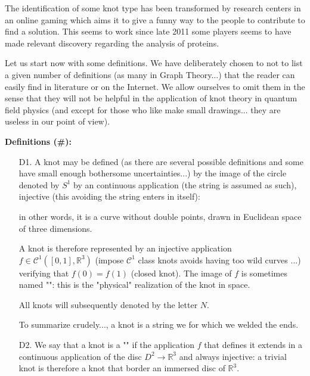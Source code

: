 {	\begin{tcolorbox}[title=Remark,colframe=black,arc=10pt]
	The identification of some knot type has been transformed by research centers in an online gaming which aims it to give a funny way to the people to contribute to find a solution. This seems to work since late 2011 some players seems to have made  relevant discovery regarding the analysis of proteins.
	\end{tcolorbox}
	
	Let us start now with some definitions. We have deliberately chosen to not to list a given number of definitions (as many in Graph Theory...) that the reader can easily find in literature or on the Internet. We allow ourselves to omit them in the sense that they will not be helpful in the application of knot theory in quantum field physics (and except for those who like make small drawings... they are useless in our point of view).
	
	\textbf{Definitions (\#\mydef):}
	\begin{enumerate}
		\item[D1.] A knot may be defined (as there are several possible definitions and some have small enough bothersome uncertainties...) by the image of the circle denoted by $S^1$ by an continuous application (the string is assumed as such), injective (this avoiding the string enters in itself):
		
		in other words, it is a curve without double points, drawn in Euclidean space of three dimensions.

		A knot is therefore represented by an injective application $f\in \mathcal{C}^1 ([0,1],\mathbb{R}^3)$ (impose $\mathcal{C}^1$ class knots avoids having too wild curves ...) verifying that $f(0)=f(1)$ (closed knot). The image of $f$ is sometimes named "": this is the "physical" realization of the knot in space.
		\begin{tcolorbox}[title=Remark,colframe=black,arc=10pt]
		All knots will subsequently denoted by the letter $N$.
		\end{tcolorbox}
		
		To summarize crudely..., a knot is a string we for which we welded the ends.
		
		\item[D2.] We say that a knot is a "" if the application $f$ that defines it extends in a continuous application of the disc $D^2 \rightarrow \mathbb{R}^3$ and always injective: a trivial knot is therefore a knot that border an immersed disc of $\mathbb{R}^3$.
		

\end{enumerate}}
